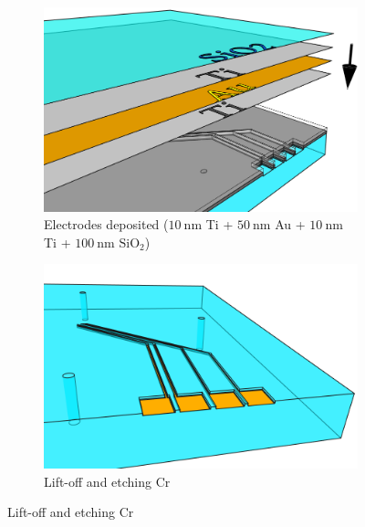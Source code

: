 \documentclass[final]{jyflluk}
\begin{document}
\begin{figure}[H]
    \begin{subfigure}{0.48\textwidth}
        \centering
        \includegraphics[width=\linewidth]{steps/5.-evap-Elec.png} 
        \caption{Electrodes deposited ($\SI{10}{\nano \metre}$ Ti + $\SI{50}{\nano \metre}$ Au + $\SI{10}{\nano \metre}$ Ti + $\SI{100}{\nano \metre}$ $\mathrm{SiO}_2$) } \label{fig:process5}
    \end{subfigure}
    \hfill
    \begin{subfigure}{0.48\textwidth}
        \centering
        \includegraphics[width=\linewidth]{steps/6.-lift_off.png} 
        \caption{Lift-off and etching Cr} \label{fig:process6}
    \end{subfigure}
 

\end{figure}
\end{document}
